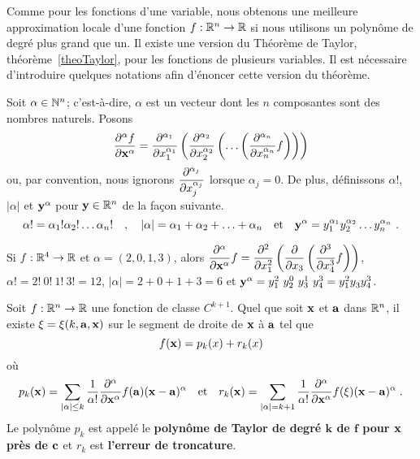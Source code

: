 {Comme pour les fonctions d'une variable, nous obtenons une meilleure
approximation locale d'une fonction $f:\RR^n \to \RR$ si nous utilisons un
polynôme de degré plus grand que un.   Il existe une version du Théorème de
Taylor, théorème~\ref{theoTaylor}, pour les fonctions de plusieurs
variables.  Il est nécessaire d'introduire quelques notations afin
d'énoncer cette version du théorème.

Soit $\alpha \in \NN^n$; c'est-à-dire, $\alpha$ est un vecteur dont
les $n$ composantes sont des nombres naturels.   Posons
\[
  \pdydxn{f}{\VEC{x}}{\alpha} = \pdfdxn{}{x_1}{\alpha_1} \left(
  \pdfdxn{}{x_2}{\alpha_2} \left( \ldots \left(
  \pdfdxn{f}{x_n}{\alpha_n}\right)\right)\right)
\]
ou, par convention, nous ignorons
$\displaystyle \pdfdxn{}{x_j}{\alpha_j}$ lorsque $\alpha_j = 0$.
De plus, définissons $\alpha!$, $|\alpha|$ et $\VEC{y}^{\alpha}$ pour
$\VEC{y}\in \RR^n$ de la façon suivante.
\[
\alpha! = \alpha_1! \alpha_2! \ldots \alpha_n! \quad , \quad
|\alpha| = \alpha_1 + \alpha_2 + \ldots + \alpha_n \quad
\text{et} \quad
\VEC{y}^{\alpha} = y_1^{\alpha_1} y_2^{\alpha_2}\ldots y_n^{\alpha_n} \ .
\]

\begin{egg}
Si $f:\RR^4 \to \RR$ et $\alpha = (2,0,1,3)$, alors
$\displaystyle \pdfdxn{f}{\VEC{x}}{\alpha} = \pdfdxn{}{x_1}{2} \left(
\pdfdx{}{x_3} \left( \pdfdxn{f}{x_4}{3}\right)\right)$,
$\alpha! = 2!\ 0!\ 1!\ 3!= 12$, $|\alpha| = 2 + 0 + 1 + 3 = 6$ et
$\VEC{y}^{\alpha} = y_1^2\ y_2^0\ y_3^1\ y_4^3 = y_1^2 y_3^{} y_4^3$.
\end{egg}

\begin{focus}{\thm} 
Soit $f:\RR^n\to \RR$ une fonction de classe $C^{k+1}$.  Quel que soit
$\VEC{x}$ et $\VEC{a}$ dans $\RR^n$, il existe $\xi = \xi(k,\VEC{a},\VEC{x})$
sur le segment de droite de $\VEC{x}$ à $\VEC{a}$ tel que
\[
f(\VEC{x}) = p_k(x) + r_k(x)
\]
où
\[
p_k(\VEC{x}) = \sum_{|\alpha|\leq k} \frac{1}{\alpha !}
  \pdfdxn{f}{\VEC{x}}{\alpha}(\VEC{a}) (\VEC{x}- \VEC{a})^{\alpha} 
\quad \text{et} \quad
r_k(\VEC{x}) = \sum_{|\alpha|=k+1} \frac{1}{\alpha !}
  \pdfdxn{f}{\VEC{x}}{\alpha}(\xi) (\VEC{x}- \VEC{a})^{\alpha} \; .
\]
Le polynôme $p_k$ est appelé le {\bfseries polynôme de Taylor de degré
$\mathbf{k}$ de $\mathbf{f}$ pour $\VEC{x}$ près de
$\VEC{c}$} et $r_k$
est {\bfseries l'erreur de troncature}.
\label{theoTaylorNdim}
\end{focus}

}
